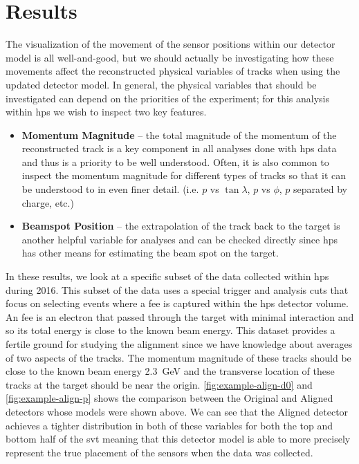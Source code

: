 \section{Results}
The visualization of the movement of the sensor positions within our detector model is all well-and-good,
but we should actually be investigating how these movements affect the reconstructed
physical variables of tracks when using the updated detector model.
In general, the physical variables that should be investigated can depend on the
priorities of the experiment; for this analysis within \ac{hps} we wish to inspect
two key features.
\begin{itemize}
  \item \textbf{Momentum Magnitude} -- the total magnitude of the momentum of the reconstructed
    track is a key component in all analyses done with \ac{hps} data and thus is a
    priority to be well understood. Often, it is also common to inspect the momentum
    magnitude for different types of tracks so that it can be understood to in even
    finer detail. (i.e. $p$ vs $\tan\lambda$, $p$ vs $\phi$, $p$ separated by charge,
    etc.)
  \item \textbf{Beamspot Position} -- the extrapolation of the track back to the target is
    another helpful variable for analyses and can be checked directly since \ac{hps}
    has other means for estimating the beam spot on the target.
\end{itemize}
In these results, we look at a specific subset of the data collected within \ac{hps}
during 2016. This subset of the data uses a special trigger and analysis cuts that
focus on selecting events where a \ac{fee} is captured within the \ac{hps} detector volume.
An \ac{fee} is an electron that passed through the target with minimal interaction and
so its total energy is close to the known beam energy.
This dataset provides a fertile ground for studying the alignment since we have
knowledge about averages of two aspects of the tracks.
The momentum magnitude of these tracks should be close to the known
beam energy \qty{2.3}{\giga\electronvolt} and the transverse location of these tracks
at the target should be near the origin.
\cref{fig:example-align-d0} and \cref{fig:example-align-p} shows the comparison between
the Original and Aligned detectors whose models were shown above.
We can see that the Aligned detector achieves a tighter distribution in both of these
variables for both the top and bottom half of the \ac{svt} meaning that this detector
model is able to more precisely represent the true placement of the sensors when the
data was collected.

